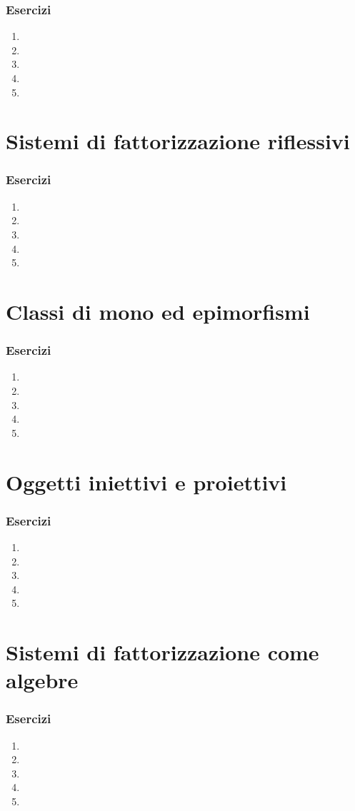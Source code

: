 \subsubsection*{Esercizi}
\begin{enumerate}
	\item
	\item
	\item
	\item
	\item
\end{enumerate}
\section[Riflessività]{Sistemi di fattorizzazione riflessivi}
\subsubsection*{Esercizi}
\begin{enumerate}
	\item
	\item
	\item
	\item
	\item
\end{enumerate}
\section[Mono ed epimorfismi]{Classi di mono ed epimorfismi}
\subsubsection*{Esercizi}
\begin{enumerate}
	\item
	\item
	\item
	\item
	\item
\end{enumerate}
\section[Iniettivi e proiettivi]{Oggetti iniettivi e proiettivi}
\subsubsection*{Esercizi}
\begin{enumerate}
	\item
	\item
	\item
	\item
	\item
\end{enumerate}
\section[Fattorizzazione e algebre]{Sistemi di fattorizzazione come algebre}
\subsubsection*{Esercizi}
\begin{enumerate}
	\item
	\item
	\item
	\item
	\item
\end{enumerate}

